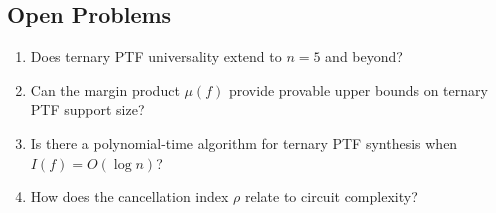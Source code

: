 \documentclass[11pt]{article}
\begin{document}
\subsection{Open Problems}

\begin{enumerate}
    \item Does ternary PTF universality extend to $n = 5$ and beyond?
    \item Can the margin product $\mu(f)$ provide provable upper bounds on ternary PTF support size?
    \item Is there a polynomial-time algorithm for ternary PTF synthesis when $I(f) = O(\log n)$?
    \item How does the cancellation index $\rho$ relate to circuit complexity?
\end{enumerate}
\end{document}
